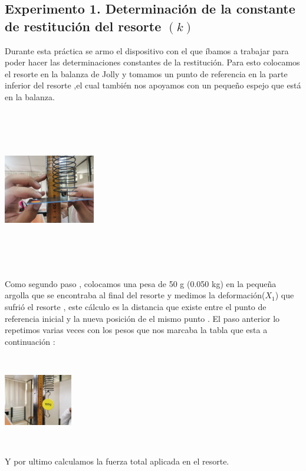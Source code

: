 \documentclass[10pt]{article}
\begin{document}
\begin{multicols}{2}
\section{Experimento 1. Determinación de la constante de restitución del resorte $(k)$}
Durante esta práctica se armo el dispositivo con el que íbamos a trabajar para poder hacer las determinaciones constantes de la restitución.
Para esto colocamos el resorte en la balanza de Jolly y tomamos un punto de referencia en la parte inferior del resorte ,el cual también nos apoyamos con un pequeño espejo que está en la balanza. 
\begin{center}
	\includegraphics[width=4cm, height=7cm]{Imagenes/medida.jpeg}
\end{center}
Como segundo paso , colocamos una pesa de 50 g (0.050 kg) en la pequeña argolla que se encontraba al final del resorte y medimos la deformación($X_{1}$) que sufrió el resorte ,  este cálculo es la distancia que existe entre el punto  de referencia inicial y la nueva posición de el mismo punto .
El paso anterior lo repetimos varias veces con los pesos que nos marcaba la tabla que esta a continuación :
\begin{center}
	\includegraphics[width=3cm, height=4cm]{Imagenes/100gr.jpeg}
\end{center}
Y por ultimo calculamos la fuerza  total aplicada en el resorte.



\end{multicols}
\end{document}
